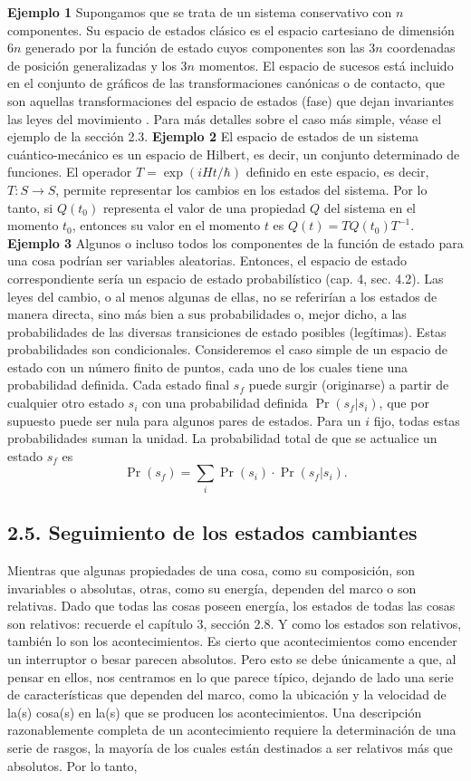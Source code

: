\begin{justifying}
    \textbf{Ejemplo 1} Supongamos que se trata de un sistema conservativo con $n$ componentes.  Su espacio de estados clásico es el espacio cartesiano de dimensión $6n$ generado por     la función de estado cuyos componentes son las $3n$ coordenadas de posición generalizadas   y los $3n$ momentos. El espacio de sucesos está incluido en el conjunto de   gráficos de las transformaciones canónicas o de contacto, que son aquellas   transformaciones del espacio de estados (fase) que dejan invariantes las leyes del movimiento . Para más detalles sobre el caso más simple, véase el ejemplo de la sección 2.3.
    \textbf{Ejemplo 2} El espacio de estados de un sistema cuántico-mecánico es un espacio de Hilbert, es decir, un conjunto determinado de funciones. El operador $T = \exp(iHt/\hbar)$ definido en este espacio, es decir, $T: S \to S$, permite representar los cambios en los estados del sistema. Por lo tanto, si $Q(t_0)$ representa el valor de una propiedad $Q$    del sistema en el momento $t_0$, entonces su valor en el momento $t$ es $Q(t) = TQ(t_0)T^   {-1}$.
    \textbf{Ejemplo 3} Algunos o incluso todos los componentes de la función de estado  para una cosa podrían ser variables aleatorias. Entonces, el espacio de estado correspondiente   sería un espacio de estado probabilístico (cap. 4, sec. 4.2). Las leyes del cambio, o  al menos algunas de ellas, no se referirían a los estados de manera directa, sino   más bien a sus probabilidades o, mejor dicho, a las probabilidades de las diversas  transiciones de estado posibles (legítimas). Estas probabilidades son condicionales.  Consideremos el caso simple de un espacio de estado con un número finito de puntos, cada uno de los cuales tiene una probabilidad definida. Cada estado final $s_f$ puede surgir (originarse) a partir de cualquier otro estado $s_i$ con una probabilidad definida $\Pr(s_f|s_i)$, que por supuesto puede ser nula para algunos pares de estados. Para un $i$ fijo, todas estas probabilidades suman la unidad. La probabilidad total de que se actualice un estado $s_f$ es
\[
\Pr(s_f) = \sum_i \Pr(s_i) \cdot \Pr(s_f|s_i).
\]

\subsection*{2.5. Seguimiento de los estados cambiantes}
Mientras que algunas propiedades de una cosa, como su composición, son invariables o absolutas, otras, como su energía, dependen del marco o son relativas. Dado que todas las cosas poseen energía, los estados de todas las cosas son relativos: recuerde el capítulo 3, sección 2.8. Y como los estados son relativos, también lo son los acontecimientos. Es cierto que acontecimientos como encender un interruptor o besar parecen absolutos. Pero esto se debe únicamente a que, al pensar en ellos, nos centramos en lo que parece típico, dejando de lado una serie de características que dependen del marco, como la ubicación y la velocidad de la(s) cosa(s) en la(s) que se producen los acontecimientos. Una descripción razonablemente completa de un acontecimiento requiere la determinación de una serie de rasgos, la mayoría de los cuales están destinados a ser relativos más que absolutos. Por lo tanto,


\end{justifying}
